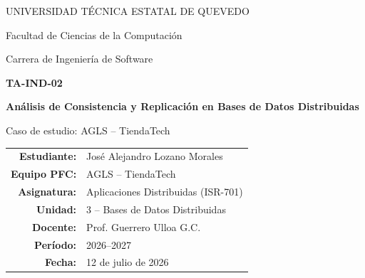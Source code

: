 \documentclass[11pt,a4paper]{article}
\begin{document}
\begin{center}
  {\large UNIVERSIDAD TÉCNICA ESTATAL DE QUEVEDO\par}
  \vspace{0.1cm}
  {\large Facultad de Ciencias de la Computación\par}
  {\large Carrera de Ingeniería de Software\par}
  \vspace{0.35cm}
  {\Large\bfseries TA-IND-02\par}
  \vspace{0.2cm}
  {\LARGE\bfseries Análisis de Consistencia y Replicación en Bases de Datos Distribuidas\par}
  \vspace{0.2cm}
  {\Large Caso de estudio: AGLS -- TiendaTech\par}
  \vspace{0.4cm}
  \begin{tabular}{rl}
    \textbf{Estudiante:} & José Alejandro Lozano Morales \\
    \textbf{Equipo PFC:} & AGLS -- TiendaTech \\
    \textbf{Asignatura:} & Aplicaciones Distribuidas (ISR-701) \\
    \textbf{Unidad:} & 3 -- Bases de Datos Distribuidas \\
    \textbf{Docente:} & Prof. Guerrero Ulloa G.C. \\
    \textbf{Período:} & 2026--2027 \\
    \textbf{Fecha:} & 12 de julio de 2026
  \end{tabular}
\end{center}
\vspace{0.25cm}
\end{document}
